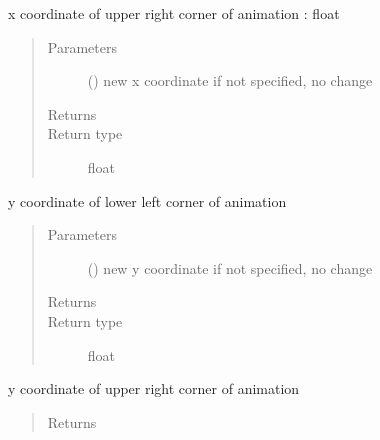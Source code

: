 \documentclass[letterpaper,10pt,english]{sphinxmanual}
\begin{document}
\begin{fulllineitems}
\begin{fulllineitems}
\label{\detokenize{Reference:salabim.Environment.x1}}
x coordinate of upper right corner of animation : float
\begin{quote}\begin{description}
\item[{Parameters}] \leavevmode
{} () \textendash{} new x coordinate 
if not specified, no change

\item[{Returns}] \leavevmode
{}

\item[{Return type}] \leavevmode
float

\end{description}\end{quote}

\end{fulllineitems}


\begin{fulllineitems}
\label{\detokenize{Reference:salabim.Environment.y0}}
y coordinate of lower left corner of animation
\begin{quote}\begin{description}
\item[{Parameters}] \leavevmode
{} () \textendash{} new y coordinate 
if not specified, no change

\item[{Returns}] \leavevmode
{}

\item[{Return type}] \leavevmode
float

\end{description}\end{quote}

\end{fulllineitems}


\begin{fulllineitems}
\label{\detokenize{Reference:salabim.Environment.y1}}
y coordinate of upper right corner of animation
\begin{quote}\begin{description}
\item[{Returns}] \leavevmode
{}


\end{description}
\end{quote}
\end{fulllineitems}
\end{fulllineitems}
\end{document}
